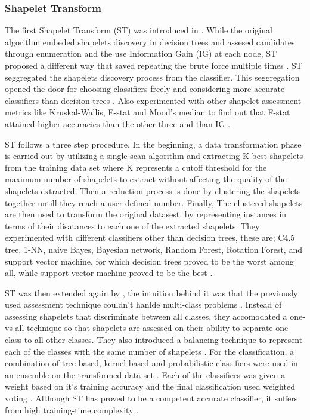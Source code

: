 \subsubsection{Shapelet Transform}
\label{SubsubsectionST}
The first Shapelet Transform (ST) was introduced in \cite{hills2014classification}.
While the original algorithm embeded shapelets discovery in decision trees and assesed candidates through enumeration and 
the use Information Gain (IG) at each node, ST proposed a different way that saved repeating the brute force multiple times \cite{bostrom2018shapelet}.
ST seggregated the shapelets discovery process from the classifier. This seggregation opened the door for choosing classifiers freely and considering more accurate
classifiers than decision trees \cite{bagnall2017great,lines2015time}. Also \cite{hills2014classification} experimented with other shapelet assessment metrics like Kruskal-Wallis, F-stat and Mood’s median
to find out that F-stat attained higher accuracies than the other three and than IG \cite{bostrom2018shapelet}.

ST follows a three step procedure. In the beginning, a data transformation phase is carried out by utilizing a single-scan algorithm and extracting K best shapelets from the training
data set where K represents a cutoff threshold for the maximum number of shapelets to extract without affecting the quality of the shapelets extracted.
Then a reduction process is done by clustering the shapelets together untill they reach a user defined number.
Finally, The clustered shapelets are then used to transform the original datasest, by representing instances in terms of their disatances to each one of the extracted shapelets.
They experimented with different classifiers other than decision trees, these are; C4.5 tree, 1-NN, naive Bayes, Bayesian network, Random Forest, Rotation Forest, and support vector machine,
for which decision trees proved to be the worst among all, while support vector machine proved to be the best \cite{hills2014classification}.

ST was then extended again by \cite{Bostrom2017}, the intuition behind it was that the previously used assessment technique couldn't hanlde multi-class problems \cite{Bostrom2017}.
Instead of assessing shapelets that discriminate between all classes, they accomodated a one-vs-all technique so that shapelets are assessed on their ability to separate one class to all other classes.
They also introduced a balancing technique to represent each of the classes with the same number of shapelets \cite{bagnall2017great}.
For the classification, a combination of tree based, kernel based and probabilistic classifiers were used in an ensemble on the transformed data set \cite{shifaz2020ts,lines2018time}.
Each of the classifiers was given a weight based on it's training accuracy and the final classification used weighted voting \cite{Bostrom2017}.
Although ST has proved to be a competent accurate classifier, it suffers from high training-time complexity \cite{shifaz2020ts}.